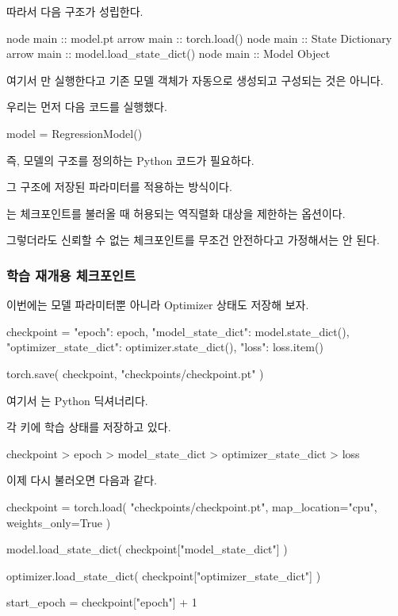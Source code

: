 따라서 다음 구조가 성립한다.

\begin{dhkbranch}[in=8]
node main :: model.pt
arrow main :: torch.load()
node main :: State Dictionary
arrow main :: model.load_state_dict()
node main :: Model Object
\end{dhkbranch}

여기서 만 실행한다고 기존 모델 객체가 자동으로 생성되고 구성되는 것은 아니다.

우리는 먼저 다음 코드를 실행했다.

\begin{dhkcode}
model = RegressionModel()
\end{dhkcode}

즉, 모델의 구조를 정의하는 Python 코드가 필요하다.

그 구조에 저장된 파라미터를 적용하는 방식이다.

는 체크포인트를 불러올 때 허용되는 역직렬화 대상을 제한하는 옵션이다.

그렇더라도 신뢰할 수 없는 체크포인트를 무조건 안전하다고 가정해서는 안 된다.

\subsubsection{학습 재개용 체크포인트}

이번에는 모델 파라미터뿐 아니라 Optimizer 상태도 저장해 보자.

\begin{dhkcode}
checkpoint = {
    "epoch": epoch,
    "model_state_dict": model.state_dict(),
    "optimizer_state_dict": optimizer.state_dict(),
    "loss": loss.item()
}

torch.save(
    checkpoint,
    "checkpoints/checkpoint.pt"
)
\end{dhkcode}

여기서 는 Python 딕셔너리다.

각 키에 학습 상태를 저장하고 있다.

\begin{dhkdir}[in=6]
checkpoint
> epoch
> model_state_dict
> optimizer_state_dict
> loss
\end{dhkdir}

이제 다시 불러오면 다음과 같다.

\begin{dhkcode}
checkpoint = torch.load(
    "checkpoints/checkpoint.pt",
    map_location="cpu",
    weights_only=True
)

model.load_state_dict(
    checkpoint["model_state_dict"]
)

optimizer.load_state_dict(
    checkpoint["optimizer_state_dict"]
)

start_epoch = checkpoint["epoch"] + 1
\end{dhkcode}


